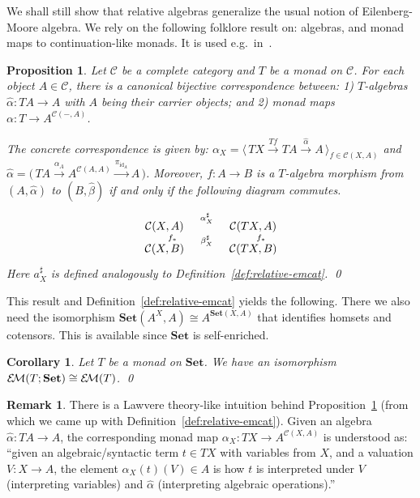 \documentclass[9pt, preprint]{sigplanconf}
\theoremstyle{theorem}
\newtheorem{proposition}[theorem]{Proposition}
\newtheorem{corollary}[theorem]{Corollary}
\theoremstyle{definition}
\newtheorem{remark}[theorem]{Remark}
\newcommand{\cat}[1]{\mathcal{#1}}
\newcommand{\place}{{-}}
\newcommand{\id}{\mathrm{id}}
\newcommand{\Set}{\mathbf{Set}}
\newcommand{\Sets}{\Set}
\newcommand{\EM}{\mathcal{E}{\kern-.5ex}\mathcal{M}}
\begin{document}
 We shall still
show that relative algebras  generalize the usual
notion of Eilenberg-Moore algebra.
We rely on the following folklore result on: algebras, and monad maps to
continuation-like monads. It is used e.g.\ in~\cite{Kelly80,KellyP93}.
\begin{proposition}
  \label{prop:emalg-monadmap}
  Let $\cat{C}$ be a complete category and $T$ be a monad on
 $\cat{C}$. For each object $A\in \cat{C}$,
  there is a canonical bijective correspondence between:
 1)   $T$-algebras $\hat{\alpha} \colon T A \to A$ with $A$ being their carrier objects;
  and 2) monad maps $\alpha \colon T \to A^{\cat{C}(\place, A)}$.

  The concrete correspondence is given by:
  \begin{math}
  \alpha_{X}=\bigl\langle \, TX\xrightarrow{Tf}TA\xrightarrow{\hat{\alpha}}A\,\bigr\rangle_{f\in
   \cat{C}(X,A)}
  \end{math} and
  \begin{math}
    \hat{\alpha} =
    \bigl(\,
   TA\xrightarrow{\alpha_{A}}A^{\cat{C}(A,A)}\xrightarrow{\pi_{\id_{A}}}
    A
\,\bigr)
  \end{math}.
Moreover, $f \colon A \to B$ is a $T$-algebra morphism from $(A,\hat{\alpha})$ to $(B,\hat{\beta})$
  if and only if the following diagram commutes.
  \begin{align*}
    \xymatrix@R-2em@C+1em{
      \cat{C}(X, A) \ar[r]^-{\alpha^{\sharp}_X} \ar[d]^-{f_*}
      & \cat{C}(TX, A) \ar[d]^-{f_*} \\
      \cat{C}(X, B) \ar[r]^-{\beta^{\sharp}_X}
      & \cat{C}(TX, B)
}
  \end{align*}
 Here $a^{\sharp}_{X}$ is defined analogously to
 Definition~\ref{def:relative-emcat}.
 \qed
\end{proposition}
This result and Definition~\ref{def:relative-emcat} yields the
following.
There we also need the isomorphism
 $\Sets(A^{X},A)\cong A^{\Sets(X,A)}$ that identifies homsets and
 cotensors. This is available since $\Sets$ is self-enriched.
\begin{corollary}\label{cor:SetsRelativeIsOrdinary}
 Let $T$ be a monad on $\Sets$. We have an isomorphism
 $\EM(T;\Sets)\cong\EM(T)$.
\qed
\end{corollary}


\begin{remark}
 There is a Lawvere theory-like intuition behind
 Proposition~\ref{prop:emalg-monadmap} (from which we came up with
 Definition~\ref{def:relative-emcat}). Given an algebra $\hat{\alpha} \colon
 TA\to A$,
 the corresponding monad map $\alpha_{X}\colon TX\to A^{\cat{C}(X,A)}$
 is understood as: ``given an algebraic/syntactic term $t\in TX$ with variables
 from $X$, and a valuation $V\colon X\to A$, the element $\alpha_{X}(t)(V)\in
 A$ is how $t$ is interpreted under $V$ (interpreting variables) and
 $\hat{\alpha}$
 (interpreting algebraic operations).''
 \end{remark}
\end{document}
